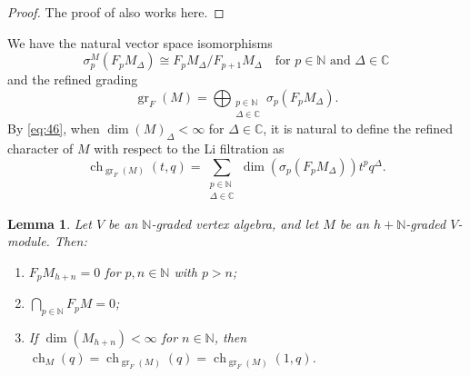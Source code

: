 \documentclass[a4paper, 12pt, reqno]{amsart}
\newtheorem{lemma}[theorem]{Lemma}
\theoremstyle{remark}
\DeclareMathOperator{\gr}{gr}
\DeclareMathOperator{\ch}{ch}
\begin{document}
\begin{proof}
  The proof of  also works here.
\end{proof}

We have the natural vector space isomorphisms
\begin{equation}
  \label{eq:45}
  \sigma^M_p(F_pM_{\Delta}) \cong F_pM_{\Delta}/F_{p + 1}M_{\Delta} \quad \text{for $p \in \mathbb{N}$ and $\Delta \in \mathbb{C}$}
\end{equation}
and the refined grading
\begin{equation}
  \label{eq:46}
  \gr_F(M) = \bigoplus_{\substack{p \in \mathbb{N} \\ \Delta \in \mathbb{C}}}\sigma_p(F_pM_{\Delta}).
\end{equation}
By \eqref{eq:46}, when $\dim(M)_{\Delta} < \infty$ for $\Delta \in \mathbb{C}$, it is natural to define the refined character of $M$ with respect to the Li filtration as
\begin{equation*}
  \ch_{\gr_F(M)}(t, q) = \sum_{\substack{p \in \mathbb{N} \\ \Delta \in \mathbb{C}}}\dim(\sigma_p(F_pM_{\Delta}))t^pq^{\Delta}.
\end{equation*}

\begin{lemma}
  \label{lmm:25}
  Let $V$ be an $\mathbb{N}$-graded vertex algebra, and let $M$ be an $h + \mathbb{N}$-graded $V$-module.
  Then:
  \begin{enumerate}
  \item $F_pM_{h + n} = 0$ for $p, n \in \mathbb{N}$ with $p > n$;
  \item $\bigcap_{p \in \mathbb{N}}F_pM = 0$;
  \item If $\dim(M_{h + n}) < \infty$ for $n \in \mathbb{N}$, then $\ch_M(q) = \ch_{\gr_F(M)}(q) = \ch_{\gr_F(M)}(1, q)$.
  \end{enumerate}
\end{lemma}
\end{document}
